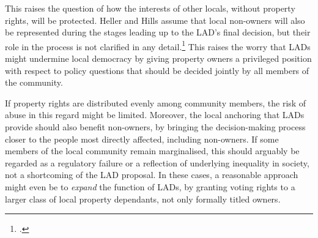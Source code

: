 This raises the question of how the interests of other locals, without property rights, will be protected. Heller and Hills assume that local non-owners will also be represented during the stages leading up to the LAD's final decision, but their role in the process is not clarified in any detail.\footcite[1490-1491]{heller08} This raises the worry that LADs might undermine local democracy by giving property owners a privileged position with respect to policy questions that should be decided jointly by all members of the community. 

If property rights are distributed evenly among community members, the risk of abuse in this regard might be limited. Moreover, the local anchoring that LADs provide should also benefit non-owners, by bringing the decision-making process closer to the people most directly affected, including non-owners. If some members of the local community remain marginalised, this should arguably be regarded as a regulatory failure or a reflection of underlying inequality in society, not a shortcoming of the LAD proposal. In these cases, a reasonable approach might even be to {\it expand} the function of LADs, by granting voting rights to a larger class of local property dependants, not only formally titled owners.%


